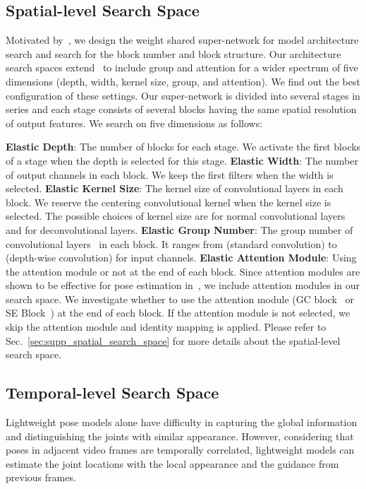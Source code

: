 \documentclass[final]{cvpr}
\begin{document}
\subsection{Spatial-level Search Space}
 \label{sec:spatial_level}
Motivated by~\cite{cai2020once,yu2020bignas}, we design the weight shared super-network for model architecture search and search for the block number and block structure. Our architecture search spaces extend~\cite{cai2020once,yu2020bignas} to include group and attention for a wider spectrum of five dimensions (depth, width, kernel size, group, and attention). We find out the best configuration of these settings. Our super-network is divided into several stages in series and each stage consists of several blocks having the same spatial resolution of output features. We search on five dimensions as follows:

\textbf{Elastic Depth}: The number of blocks for each stage. We activate the first  blocks of a stage when the depth  is selected for this stage. 
\textbf{Elastic Width}: The number of output channels in each block. We keep the first  filters when the width  is selected.
\textbf{Elastic Kernel Size}: The kernel size of convolutional layers in each block. We reserve the centering  convolutional kernel when the kernel size  is selected. The possible choices of kernel size  are  for normal convolutional layers and  for deconvolutional layers.
\textbf{Elastic Group Number}: The group number of convolutional layers~\cite{krizhevsky2017imagenet} in each block. It ranges from  (standard convolution) to  (depth-wise convolution) for  input channels.
\textbf{Elastic Attention Module}:
Using the attention module or not at the end of each block. Since attention modules are shown to be effective for pose estimation in~\cite{chu2017multi,su2019multi},
we include attention modules in our search space. We investigate whether to use the attention module (\eg GC block~\cite{cao2019gcnet} or SE Block~\cite{hu2018squeeze}) at the end of each block. If the attention module is not selected, we skip the attention module and identity mapping is applied. Please refer to Sec.~\ref{sec:supp_spatial_search_space} for more details about the spatial-level search space.

\subsection{Temporal-level Search Space}
\label{sec:temporal_level}

Lightweight pose models alone have difficulty in capturing the global information and distinguishing the joints with similar appearance. However, considering that poses in adjacent video frames are temporally correlated, lightweight models can estimate the joint locations with the local appearance and the guidance from previous frames. 
\end{document}
